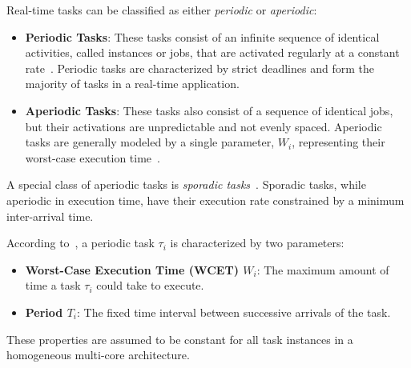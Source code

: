 \documentclass[conference]{IEEEtran}
\begin{document}
Real-time tasks can be classified as either \textit{periodic} or \textit{aperiodic}:
\begin{itemize}
    \item \textbf{Periodic Tasks}: These tasks consist of an infinite sequence of identical activities, called instances or jobs, that are activated regularly at a constant rate~\cite{butazo99}. Periodic tasks are characterized by strict deadlines and form the majority of tasks in a real-time application. 
    
    \item \textbf{Aperiodic Tasks}: These tasks also consist of a sequence of identical jobs, but their activations are unpredictable and not evenly spaced. Aperiodic tasks are generally modeled by a single parameter, $W_i$, representing their worst-case execution time~\cite{AbdallahGB24}.
\end{itemize}

A special class of aperiodic tasks is \textit{sporadic tasks}~\cite{butazo99}. Sporadic tasks, while aperiodic in execution time, have their execution rate constrained by a minimum inter-arrival time. 

According to~\cite{5465974}, a periodic task $\tau_i$ is characterized by two parameters:
\begin{itemize}
    \item \textbf{Worst-Case Execution Time (WCET) $W_i$}: The maximum amount of time a task $\tau_i$ could take to execute.
    \item \textbf{Period $T_i$}: The fixed time interval between successive arrivals of the task.
\end{itemize}
These properties are assumed to be constant for all task instances in a homogeneous multi-core architecture.

\end{document}
